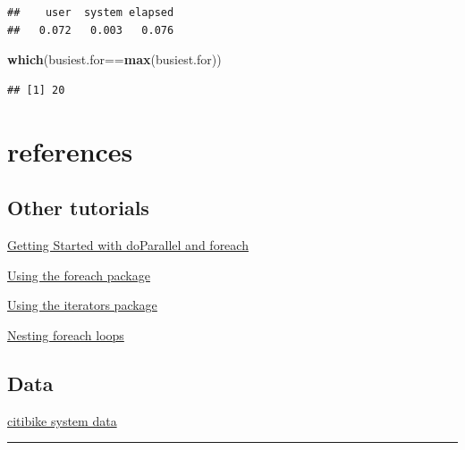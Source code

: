 \documentclass[]{article}
\newenvironment{Shaded}{\begin{snugshade}}{\end{snugshade}}
\newcommand{\KeywordTok}[1]{\textcolor[rgb]{0.13,0.29,0.53}{\textbf{{#1}}}}
\newcommand{\NormalTok}[1]{{#1}}
\begin{document}
\begin{verbatim}
##    user  system elapsed 
##   0.072   0.003   0.076
\end{verbatim}

\begin{Shaded}
\begin{Highlighting}[]
\KeywordTok{which}\NormalTok{(busiest.for==}\KeywordTok{max}\NormalTok{(busiest.for))    }
\end{Highlighting}
\end{Shaded}

\begin{verbatim}
## [1] 20
\end{verbatim}

\section{{references}}\label{references}

\subsection{Other tutorials}\label{other-tutorials}

\href{http://cran.r-project.org/web/packages/doParallel/vignettes/gettingstartedParallel.pdf}{Getting
Started with doParallel and foreach}

\href{http://cran.r-project.org/web/packages/foreach/vignettes/foreach.pdf}{Using
the foreach package}

\href{http://cran.r-project.org/web/packages/iterators/vignettes/iterators.pdf}{Using
the iterators package}

\href{http://cran.r-project.org/web/packages/foreach/vignettes/nested.pdf}{Nesting
foreach loops}

\subsection{Data}\label{data-1}

\href{https://www.citibikenyc.com/system-data}{citibike system data}

\begin{center}\rule{0.5\linewidth}{\linethickness}\end{center}
\end{document}
